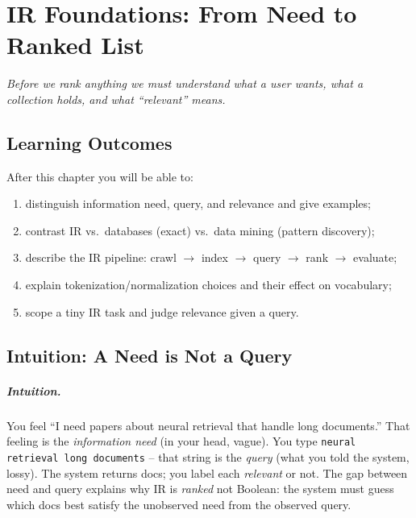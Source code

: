 \chapter{IR Foundations: From Need to Ranked List}\label{ch:foundations}
\begin{center}\small\textit{Before we rank anything we must understand what a user wants, what a collection holds, and what ``relevant'' means.}\end{center}

\noindent{}
\vspace{0.4em}

\section*{Learning Outcomes}
After this chapter you will be able to:
\begin{enumerate}[label=(L\arabic*)]
  \item distinguish information need, query, and relevance and give examples;
  \item contrast IR vs.\ databases (exact) vs.\ data mining (pattern discovery);
  \item describe the IR pipeline: crawl $\to$ index $\to$ query $\to$ rank $\to$ evaluate;
  \item explain tokenization/normalization choices and their effect on vocabulary;
  \item scope a tiny IR task and judge relevance given a query.
\end{enumerate}

\section{Intuition: A Need is Not a Query}\label{sec:need}
\paragraph{Intuition.} You feel ``I need papers about neural retrieval that handle long documents.'' That feeling is the \emph{information need} (in your head, vague). You type \texttt{neural retrieval long documents} -- that string is the \emph{query} (what you told the system, lossy). The system returns docs; you label each \emph{relevant} or not. The gap between need and query explains why IR is \emph{ranked} not Boolean: the system must guess which docs best satisfy the unobserved need from the observed query.

